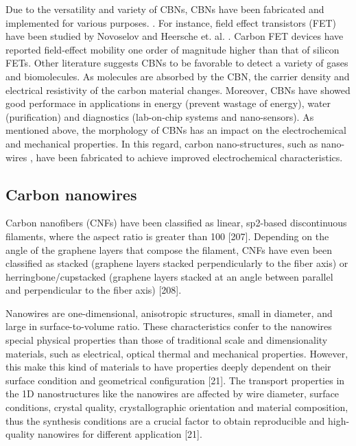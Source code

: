 Due to the versatility and variety of CBNs, CBNs have been fabricated and implemented for various purposes. \cite{Geim2011, Katsnelson2008, Li2008, Geim2007, Geim2009, Siddiqui2019}. For instance, field effect transistors (FET) have been studied by Novoselov \cite{Novoselov2004} and Heersche et. al. \cite{Heersche2007}. Carbon FET devices have reported field-effect mobility one order of magnitude higher than that of silicon FETs. Other literature suggests CBNs to be favorable to detect a variety of gases and biomolecules. \cite{Schedin2007, Ohno2009} As molecules are absorbed by the CBN, the carrier density and electrical resistivity of the carbon material changes. Moreover, CBNs have showed good performace in applications in energy (prevent wastage of energy), water (purification) and diagnostics (lab-on-chip systems and nano-sensors). \cite{Cao2011, Khanna2016} As mentioned above, the morphology of CBNs has an impact on the electrochemical and mechanical properties. \cite{Marsh1989, Hugh1994, Guo2018} In this regard, carbon nano-structures, such as nano-wires \cite{Kundu2019, Bencheikh2019, Bencheikh2019}, have been fabricated to achieve improved electrochemical characteristics.

\subsection{Carbon nanowires}

Carbon nanofibers (CNFs) have been classified as linear, sp2-based discontinuous filaments, where the aspect ratio is greater than 100 [207]. Depending on the angle of the graphene layers that compose the filament, CNFs have even been classified as stacked (graphene layers stacked perpendicularly to the fiber axis) or herringbone/cupstacked (graphene layers stacked at an angle between parallel and perpendicular to the fiber axis) [208].

Nanowires are one-dimensional, anisotropic structures, small in diameter, and large in surface-to-volume ratio. These characteristics confer to the nanowires special physical properties than those of traditional scale and dimensionality materials, such as electrical, optical thermal and mechanical properties. However, this make this kind of materials to have properties deeply dependent on their surface condition and geometrical configuration [21]. The transport properties in the 1D nanostructures like the nanowires are affected by wire diameter, surface conditions, crystal quality, crystallographic orientation and material composition, thus the synthesis conditions are a crucial factor to obtain reproducible and high-quality nanowires for different application [21].

